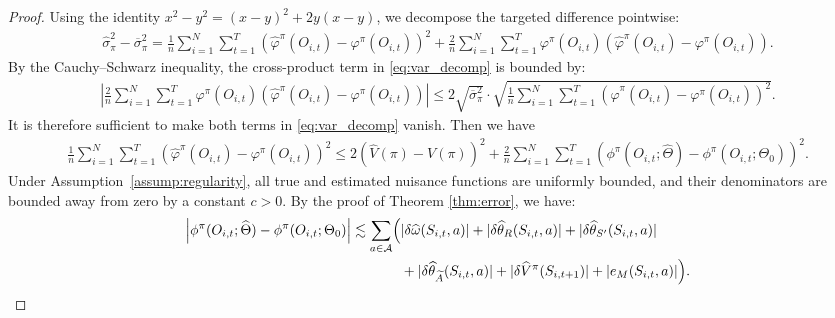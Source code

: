 \documentclass[12pt]{article}
\newcommand{\0}{\boldsymbol{0}}
\begin{document}
\begin{proof}
Using the identity $x^2 - y^2 = (x-y)^2 + 2y(x-y)$, we decompose the targeted difference pointwise:
\begin{align}
\widehat{\sigma}_\pi^2 - \overline{\sigma}_\pi^2 = \frac{1}{n}\sum_{i=1}^N\sum_{t=1}^T \left( \widehat{\varphi}^\pi(O_{i,t}) - \varphi^\pi(O_{i,t}) \right)^2 + \frac{2}{n}\sum_{i=1}^N\sum_{t=1}^T \varphi^\pi(O_{i,t}) \left( \widehat{\varphi}^\pi(O_{i,t}) - \varphi^\pi(O_{i,t}) \right). \label{eq:var_decomp}
\end{align}
By the Cauchy--Schwarz inequality, the cross-product term in \eqref{eq:var_decomp} is bounded by:
\begin{align*}
\left| \frac{2}{n}\sum_{i=1}^N\sum_{t=1}^T \varphi^\pi(O_{i,t}) \left( \widehat{\varphi}^\pi(O_{i,t}) - \varphi^\pi(O_{i,t}) \right) \right| \le 2 \sqrt{\overline{\sigma}_\pi^2} \cdot \sqrt{\frac{1}{n}\sum_{i=1}^N\sum_{t=1}^T \left( \widehat{\varphi}^\pi(O_{i,t}) - \varphi^\pi(O_{i,t}) \right)^2}.
\end{align*}
It is therefore sufficient to make both terms in \eqref{eq:var_decomp} vanish. Then we have
\begin{align}
\frac{1}{n}\sum_{i=1}^N\sum_{t=1}^T \left( \widehat{\varphi}^\pi(O_{i,t}) - \varphi^\pi(O_{i,t}) \right)^2 \le 2 \left( \widehat{V}(\pi) - V(\pi) \right)^2 + \frac{2}{n}\sum_{i=1}^N\sum_{t=1}^T \left( \phi^\pi(O_{i,t}; \widehat{\Theta}) - \phi^\pi(O_{i,t}; \Theta_0) \right)^2. \label{eq:phi_bound}
\end{align}
Under Assumption~\ref{assump:regularity}, all true and estimated nuisance functions are uniformly bounded, and their denominators are bounded away from zero by a constant $c > 0$. By the proof of Theorem \ref{thm:error}, we have:
\begin{align*}
\left| \phi^\pi(O_{i,t}; \widehat{\Theta}) - \phi^\pi(O_{i,t}; \Theta_0) \right| \lesssim \sum_{a \in \mathcal{A}} \Bigl( & |\delta \widehat{\omega}(S_{i,t},a)| + |\delta \widehat{\theta}_R(S_{i,t},a)| + |\delta \widehat{\theta}_{S'}(S_{i,t},a)| \\
& + |\delta \widehat{\theta}_{\widetilde{A}}(S_{i,t},a)| + |\delta \widehat{V}^\pi(S_{i,t+1})| + |e_M(S_{i,t},a)| \Bigr).
\end{align*}


\end{proof}
\end{document}
